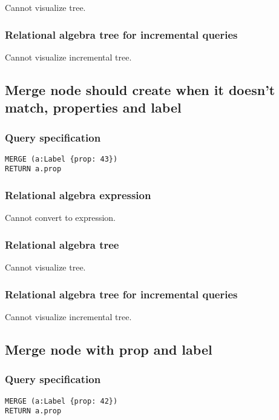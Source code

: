 Cannot visualize tree.

\subsubsection*{Relational algebra tree for incremental queries}

Cannot visualize incremental tree.

\subsection{Merge node should create when it doesn't match, properties and label}

\subsubsection*{Query specification}

\begin{lstlisting}
MERGE (a:Label {prop: 43})
RETURN a.prop
\end{lstlisting}

\subsubsection*{Relational algebra expression}

Cannot convert to expression.

\subsubsection*{Relational algebra tree}

Cannot visualize tree.

\subsubsection*{Relational algebra tree for incremental queries}

Cannot visualize incremental tree.

\subsection{Merge node with prop and label}

\subsubsection*{Query specification}

\begin{lstlisting}
MERGE (a:Label {prop: 42})
RETURN a.prop
\end{lstlisting}

